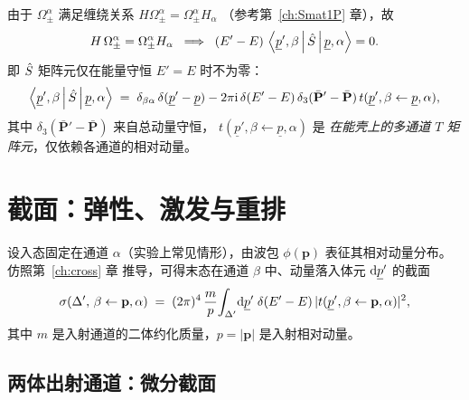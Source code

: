 由于 $\Omega_\pm^\alpha$ 满足缠绕关系 $H\Omega_\pm^\alpha=\Omega_\pm^\alpha H_\alpha$
（参考第~\ref{ch:Smat1P} 章），故
\begin{equation}
  H\,\Omega_\pm^\alpha = \Omega_\pm^\alpha H_\alpha\;\;
  \Longrightarrow\;\;
  (E'-E)\,\left\langle \underline{p}',\beta \,\middle|\, \hat{S} \,\middle|\, \underline{p},\alpha \right\rangle=0 .
\end{equation}
即 $\hat{S}$ 矩阵元仅在能量守恒 $E'=E$ 时不为零：
\begin{equation}
  \left\langle \underline{p}',\beta \,\middle|\, \hat{S} \,\middle|\, \underline{p},\alpha \right\rangle
  \;=\;\delta_{\beta\alpha}\,\delta(\underline{p}'-\underline{p})
   - 2\pi\mathrm{i}\,\delta(E'-E)\,\delta_3(\bar{\mathbf{P}}'-\bar{\mathbf{P}})\,
     t(\underline{p}',\beta\leftarrow\underline{p},\alpha) ,
  \label{eq:multich-Tmat}
\end{equation}
其中 $\delta_3(\bar{\mathbf{P}}'-\bar{\mathbf{P}})$ 来自总动量守恒，
$t(\underline{p}',\beta\leftarrow\underline{p},\alpha)$ 是
\emph{在能壳上的多通道 $T$ 矩阵元}，仅依赖各通道的相对动量。

\section{截面：弹性、激发与重排}
\label{sec:multich-cross}

设入态固定在通道 $\alpha$（实验上常见情形），由波包
$\phi(\mathbf{p})$ 表征其相对动量分布。仿照第~\ref{ch:cross} 章
推导，可得末态在通道 $\beta$ 中、动量落入体元 $\mathrm{d}\underline{p}'$
的截面
\begin{equation}
  \sigma(\Delta',\,\beta\leftarrow\mathbf{p},\alpha)
  \;=\;(2\pi)^4\,\frac{m}{p}\!\int_{\Delta'}\!\mathrm{d}\underline{p}'\;
       \delta(E'-E)\,
       |t(\underline{p}',\beta\leftarrow\mathbf{p},\alpha)|^2 ,
\end{equation}
其中 $m$ 是入射通道的二体约化质量，$p=|\mathbf{p}|$ 是入射相对动量。

\subsection{两体出射通道：微分截面}

